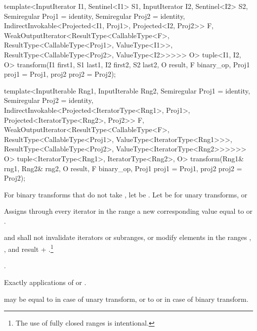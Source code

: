 \begin{addedblock}
\begin{itemdecl}
template<InputIterator I1, Sentinel<I1> S1, InputIterator I2, Sentinel<I2> S2,
    Semiregular Proj1 = identity, Semiregular Proj2 = identity,
  IndirectInvokable<Projected<I1, Proj1>, Projected<I2, Proj2>> F,
    WeakOutputIterator<ResultType<CallableType<F>,
      ResultType<CallableType<Proj1>, ValueType<I1>>,
      ResultType<CallableType<Proj2>, ValueType<I2>>>>> O>
  tuple<I1, I2, O>
  transform(I1 first1, S1 last1, I2 first2, S2 last2, O result,
            F binary_op, Proj1 proj1 = Proj1{}, proj2 proj2 = Proj2{});

template<InputIterable Rng1, InputIterable Rng2,
    Semiregular Proj1 = identity, Semiregular Proj2 = identity,
    IndirectInvokable<Projected<IteratorType<Rng1>, Proj1>,
      Projected<IteratorType<Rng2>, Proj2>> F,
    WeakOutputIterator<ResultType<CallableType<F>,
      ResultType<CallableType<Proj1>, ValueType<IteratorType<Rng1>>>,
      ResultType<CallableType<Proj2>, ValueType<IteratorType<Rng2>>>>>> O>
  tuple<IteratorType<Rng1>, IteratorType<Rng2>, O>
    transform(Rng1& rng1, Rng2& rng2, O result,
              F binary_op, Proj1 proj1 = Proj1{}, proj2 proj2 = Proj2{});
\end{itemdecl}
\end{addedblock}

\begin{itemdescr}
\begin{addedblock}
\pnum
For binary transforms that do not take , let 
be . Let  be 
for unary transforms, or 
\end{addedblock}

\pnum
\effects
Assigns through every iterator
in the range
a new
corresponding value equal to
or
.

\pnum
\requires
{} and 
shall not invalidate iterators or subranges, or modify elements in the ranges
,
,
and
{result + }.\footnote{The use of fully
closed ranges is intentional.}

\pnum
\returns
{}
.

\pnum
\complexity
Exactly
applications of
 or .

\pnum
\notes
{} may be equal to 
in case of unary transform,
or to  or 
in case of binary transform.
\end{itemdescr}

